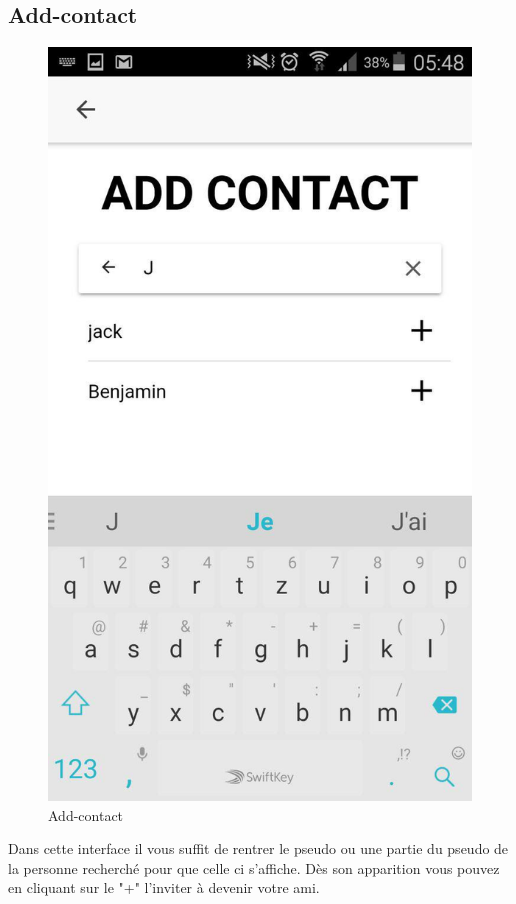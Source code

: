 \documentclass[french]{article}
\begin{document}
	\subsection{Add-contact}
		\begin{figure}[H]
			\centering
			\includegraphics[scale=0.4]{../screenshot/screenshot-add-contact}
			\caption{Add-contact}
			\label{Add-contact}
		\end{figure} 
	Dans cette interface il vous suffit de rentrer le pseudo ou une partie du pseudo de la personne recherché pour que celle ci s'affiche. Dès son apparition vous pouvez en cliquant sur le "+" l'inviter à devenir votre ami.
\end{document}

